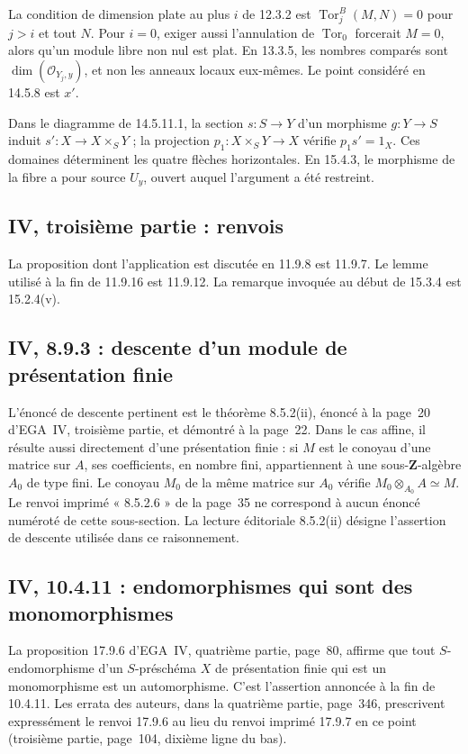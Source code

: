 La condition de dimension plate au plus $i$ de 12.3.2 est
$\operatorname{Tor}^B_j(M,N)=0$ pour $j>i$ et tout $N$.
Pour $i=0$, exiger aussi l'annulation de $\operatorname{Tor}_0$
forcerait $M=0$, alors qu'un module libre non nul est plat.
En 13.3.5, les nombres comparés sont
$\dim(\mathcal O_{Y_j,y})$, et non les anneaux locaux eux-mêmes.
Le point considéré en 14.5.8 est $x'$.

Dans le diagramme de 14.5.11.1, la section $s:S\to Y$ d'un
morphisme $g:Y\to S$ induit $s':X\to X\times_S Y$ ; la projection
$p_1:X\times_S Y\to X$ vérifie $p_1s'=1_X$.
Ces domaines déterminent les quatre flèches horizontales.
En 15.4.3, le morphisme de la fibre a pour source $U_y$,
ouvert auquel l'argument a été restreint.

\subsection{IV, troisième partie : renvois}
\label{note:iv3-refs}
La proposition dont l'application est discutée en 11.9.8 est 11.9.7.
Le lemme utilisé à la fin de 11.9.16 est 11.9.12.
La remarque invoquée au début de 15.3.4 est 15.2.4(v).
\par

\subsection{IV, 8.9.3 : descente d'un module de présentation finie}
L'énoncé de descente pertinent est le théorème 8.5.2(ii), énoncé à la
page~20 d'EGA~IV, troisième partie, et démontré à la page~22. Dans le
cas affine, il résulte aussi directement d'une présentation finie :
si $M$ est le conoyau d'une matrice sur $A$, ses coefficients, en
nombre fini, appartiennent à une sous-$\mathbf Z$-algèbre $A_0$ de
type fini. Le conoyau $M_0$ de la même matrice sur $A_0$ vérifie
$M_0\otimes_{A_0}A\simeq M$.
Le renvoi imprimé « 8.5.2.6 » de la page~35 ne correspond à aucun
énoncé numéroté de cette sous-section. La lecture éditoriale 8.5.2(ii)
désigne l'assertion de descente utilisée dans ce raisonnement.

\subsection{IV, 10.4.11 : endomorphismes qui sont des monomorphismes}
La proposition 17.9.6 d'EGA~IV, quatrième partie, page~80, affirme
que tout $S$-endomorphisme d'un $S$-préschéma $X$ de présentation
finie qui est un monomorphisme est un automorphisme. C'est l'assertion
annoncée à la fin de 10.4.11. Les errata des auteurs, dans la quatrième
partie, page~346, prescrivent expressément le renvoi 17.9.6 au lieu
du renvoi imprimé 17.9.7 en ce point (troisième partie, page~104,
dixième ligne du bas).

